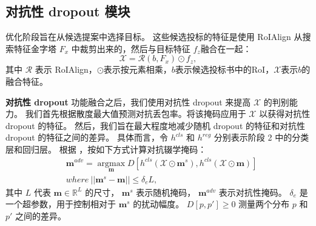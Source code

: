 \subsection{对抗性 dropout 模块}
\label{sec:stage2}
优化阶段旨在从候选提案中选择目标。
这些候选投标的特征是使用 RoIAlign \cite{he2017mask} 从搜索特征金字塔 $F_{x}$ 中裁剪出来的，然后与目标特征 $f_{z}$融合在一起：
\begin{equation}
    \mathcal{X} = \mathcal{R}(b, F_{x}) \odot f_{z},
\end{equation}
其中 $\mathcal{R}$ 表示 RoIAlign，$\odot$表示按元素相乘，$b$表示候选投标书中的RoI，$\mathcal{X}$表示$b$的融合特征。

\textbf{对抗性 dropout} 功能融合之后，我们使用对抗性 dropout \cite{park2018adversarial, lee2019drop} 来提高 $\mathcal{X}$ 的判别能力。
我们首先根据散度最大值预测对抗丢包率。将该掩码应用于 $\mathcal{X}$ 以获得对抗性 dropout 的特征。
然后，我们旨在最大程度地减少随机 dropout 的特征和对抗性 dropout 的特征之间的差异。
具体而言，令 $h^{cls}$ 和 $h^{reg}$ 分别表示阶段 2 中的分类层和回归层。
根据 \cite{lee2019drop}，按如下方式计算对抗辍学掩码：
\begin{equation}
\begin{split}
    & \mathbf{m}^{adv} = \mathop{\arg\max}\limits_{\mathbf{m}}D[h^{cls}(\mathcal{X} \odot \mathbf{m}^s), h^{cls}(\mathcal{X} \odot \mathbf{m})] \\
    & where~||\mathbf{m}^s - \mathbf{m}|| \leq \delta_e L,
\end{split}
\end{equation}
其中 $L$ 代表 $\mathbf{m} \in \mathbb R^L$ 的尺寸，
$\mathbf{m}^s$ 表示随机掩码， $\mathbf{m}^{adv}$ 表示对抗性掩码。
$\delta_{e}$ 是一个超参数，用于控制相对于 $\mathbf{m}^{s}$ \cite{lee2019drop}的扰动幅度。
$D[p, p'] \geq 0$ 测量两个分布 $p$ 和 $p'$ 之间的差异。

